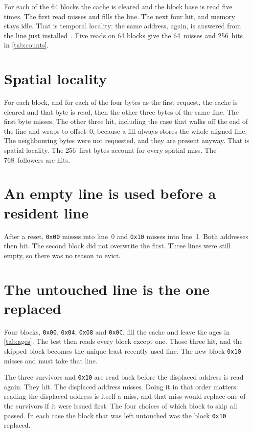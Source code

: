 \documentclass[a4paper,11pt,oneside,headings=small,parskip=half,titlepage=false]{scrreprt}
\begin{document}
For each of the 64 blocks the cache is cleared and the block base is read five times. The first read misses and fills the line. The next four hit, and memory stays idle. That is temporal locality: the same address, again, is answered from the line just installed~\cite{patterson2021}. Five reads on 64 blocks give the 64~misses and 256~hits in \cref{tab:counts}.

\section{Spatial locality}

For each block, and for each of the four bytes as the first request, the cache is cleared and that byte is read, then the other three bytes of the same line. The first byte misses. The other three hit, including the case that walks off the end of the line and wraps to offset~0, because a fill always stores the whole aligned line. The neighbouring bytes were not requested, and they are present anyway. That is spatial locality. The 256~first bytes account for every spatial miss. The 768~followers are hits.

\section{An empty line is used before a resident line}

After a reset, \texttt{0x00} misses into line~0 and \texttt{0x10} misses into line~1. Both addresses then hit. The second block did not overwrite the first. Three lines were still empty, so there was no reason to evict.

\section{The untouched line is the one replaced}

Four blocks, \texttt{0x00}, \texttt{0x04}, \texttt{0x08} and \texttt{0x0C}, fill the cache and leave the ages in \cref{tab:ages}. The test then reads every block except one. Those three hit, and the skipped block becomes the unique least recently used line. The new block \texttt{0x10} misses and must take that line.

The three survivors and \texttt{0x10} are read back before the displaced address is read again. They hit. The displaced address misses. Doing it in that order matters: reading the displaced address is itself a miss, and that miss would replace one of the survivors if it were issued first. The four choices of which block to skip all passed. In each case the block that was left untouched was the block \texttt{0x10} replaced.
\end{document}
